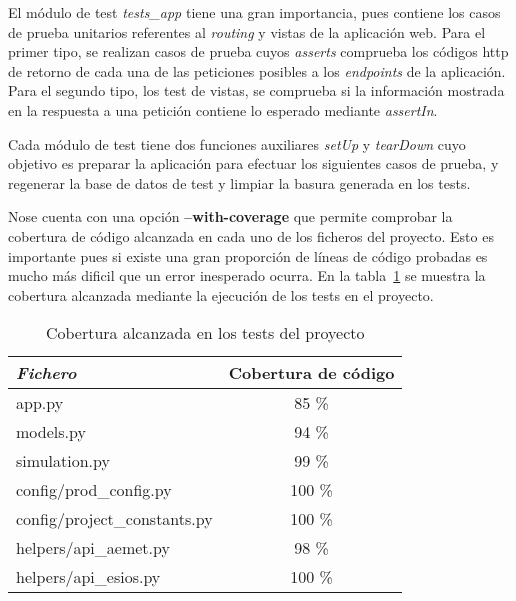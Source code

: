 El módulo de test \textit{tests\_app} tiene una gran importancia, pues contiene los casos de prueba unitarios referentes al \textit{routing} y vistas de la aplicación web. Para el primer tipo, se realizan casos de prueba cuyos \textit{asserts} comprueba los códigos http de retorno de cada una de las peticiones posibles a los \textit{endpoints} de la aplicación. Para el segundo tipo, los test de vistas, se comprueba si la información mostrada en la respuesta a una petición contiene lo esperado mediante \textit{assertIn}.

Cada módulo de test tiene dos funciones auxiliares \textit{setUp} y \textit{tearDown} cuyo objetivo es preparar la aplicación para efectuar los siguientes casos de prueba, y regenerar la base de datos de test y limpiar la basura generada en los tests.

Nose cuenta con una opción \textbf{--with-coverage} que permite comprobar la cobertura de código alcanzada en cada uno de los ficheros del proyecto. Esto es importante pues si existe una gran proporción de líneas de código probadas es mucho más dificil que un error inesperado ocurra. En la tabla~\ref{tab:testcover} se muestra la cobertura alcanzada mediante la ejecución de los tests en el proyecto.
\begin{table}[hp]
        \centering
        \begin{tabular}{|l|c|}
                \hline
                \textbf{\textit{Fichero}} & \textbf{Cobertura de código} \\ \hline
                app.py & 85 \% \\ \hline
                models.py & 94 \% \\ \hline
                simulation.py & 99 \% \\ \hline
                config/prod\_config.py & 100 \% \\ \hline
                config/project\_constants.py & 100 \% \\ \hline
                helpers/api\_aemet.py & 98 \% \\ \hline
                helpers/api\_esios.py & 100 \% \\ \hline
             \end{tabular}
        \caption{Cobertura alcanzada en los tests del proyecto}
        \label{tab:testcover}
\end{table}
